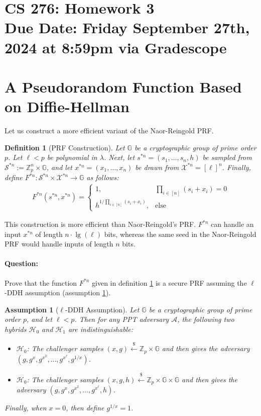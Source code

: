 \documentclass[11pt]{article}
\newtheorem{definition}[theorem]{Definition}
\newtheorem{assumption}[theorem]{Assumption}
\numberwithin{equation}{section}
\newcommand{\bbG}{\mathbb{G}}
\newcommand{\bbZ}{\mathbb{Z}}
\newcommand{\cA}{\mathcal{A}}
\newcommand{\cH}{\mathcal{H}}
\newcommand{\cS}{\mathcal{S}}
\newcommand{\cX}{\mathcal{X}}
\newcommand{\getsr}{\stackrel{\$}{\gets}}
\newcommand{\duedate}{Friday September 27th, 2024 at 8:59pm via Gradescope}
\begin{document}
\section*{CS 276: Homework 3\\ {\small Due Date: \duedate} }

\section{A Pseudorandom Function Based on Diffie-Hellman}
Let us construct a more efficient variant of the Naor-Reingold PRF. 

\begin{definition}[PRF Construction]\label{def:PRF-construction}
Let $\bbG$ be a cryptographic group of prime order $p$. Let $\ell < p$ be polynomial in $\lambda$. Next, let $s^{*n} = (s_1, \dots, s_n, h)$ be sampled from $\cS^{*n} := \bbZ_p^n \times \bbG$, and let $x^{*n} = (x_1, \dots, x_n)$ be drawn from $\cX^{*n} = [\ell]^n$. Finally, define $F^{*n}:\cS^{*n} \times \cX^{*n} \to \bbG$ as follows:
\begin{align*}
    F^{*n}(s^{*n}, x^{*n}) = 
    \begin{cases}
        1, & \prod_{i \in [n]}(s_i + x_i) = 0\\
        h^{1/\prod_{i \in [n]}(s_i + x_i)}, & \text{else}
    \end{cases}
\end{align*}
\end{definition}
This construction is more efficient than Naor-Reingold's PRF. $F^{*n}$ can handle an input $x^{*n}$ of length $n \cdot \lg(\ell)$ bits, whereas the same seed in the Naor-Reingold PRF would handle inputs of length $n$ bits.

\paragraph{Question:} Prove that the function $F^{*n}$ given in definition \ref{def:PRF-construction} is a secure PRF assuming the $\ell$-DDH assumption (assumption \ref{assumption:DDH-Variant}).

\begin{assumption}[$\ell$-DDH Assumption]\label{assumption:DDH-Variant}
Let $\bbG$ be a cryptographic group of prime order $p$, and let $\ell < p$. Then for any PPT adversary $\cA$, the following two hybrids $\cH_0$ and $\cH_1$ are indistinguishable:
\begin{itemize}
    \item $\cH_0$: The challenger samples $(x, g) \getsr \bbZ_p \times \bbG$ and then gives the adversary $(g, g^x, g^{x^2}, \dots, g^{x^\ell}, g^{1/x})$.
    \item $\cH_0$: The challenger samples $(x, g, h) \getsr \bbZ_p \times \bbG \times \bbG$ and then gives the adversary $(g, g^x, g^{x^2}, \dots, g^{x^\ell}, h)$.
\end{itemize}
Finally, when $x = 0$, then define $g^{1/x} = 1$.
\end{assumption}
\end{document}
